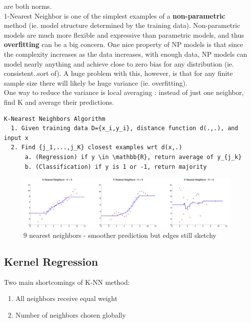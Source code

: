 \documentclass[a4paper]{article}\usepackage[]{graphicx}\usepackage[]{color}
\begin{document}
are both norms. \\

1-Nearest Neighbor is one of the simplest examples of a \textbf{non-parametric} method (ie. model structure determined by the training data). Non-parametric models are much more flexible and expressive than parametric models, and thus \textbf{overfitting} can be a big concern. One nice property of NP models is that since the complexity increases as the data increases, with enough data, NP models can model nearly anything and achieve close to zero bias for any distribution (ie. consistent..sort of). A huge problem with this, however, is that for any finite sample size there will likely be huge variance (ie. overfitting). \\

One way to reduce the variance is local averaging : instead of just one neighbor, find K and average their predictions. 

\begin{verbatim}
K-Nearest Neighbors Algorithm
  1. Given training data D={x_i,y_i}, distance function d(.,.), and input x
  2. Find {j_1,...,j_K} closest examples wrt d(x,.)
      a. (Regression) if y \in \mathbb{R}, return average of y_{j_k}
      b. (Classification) if y is 1 or -1, return majority
\end{verbatim}

\begin{figure}[H]
\centering
\includegraphics[width=6in]{9NN.png}
\caption{9 nearest neighbors - smoother prediction but edges still sketchy}
\end{figure}

\subsection{Kernel Regression}

Two main shortcomings of K-NN method:
\begin{enumerate}
\item All neighbors receive equal weight
\item Number of neighbors chosen globally
\end{enumerate}
\end{document}
